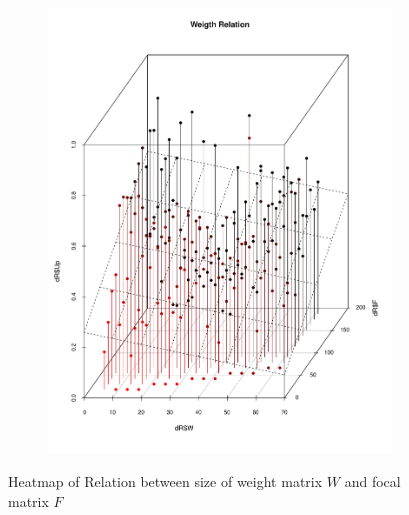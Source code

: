 \documentclass{itatnew}
\begin{document}
\begin{figure}[htp]
\begin{subfigure}{\linewidth}
    \includegraphics[width=\linewidth]{images/WeightRelationUp}
    \label{fig:WeightRealtion}
  \end{subfigure}
  \caption{Heatmap of Relation between size of weight matrix $W$ and focal matrix $F$}
  \label{fig:RealtionUp}
\end{figure}
\end{document}
